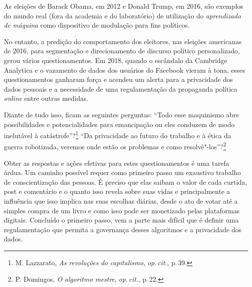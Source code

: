 As eleições de Barack Obama, em 2012 e Donald Trump, em 2016, são
exemplos do mundo real (fora da academia e do laboratório) de utilização
do \textit{aprendizado de máquina} como dispositivo de modulação para fins
políticos.

No entanto, a predição do comportamento dos eleitores, nas eleições
americanas de 2016, para segmentação e direcionamento de discurso
político personalizado, gerou vários questionamentos. Em 2018, quando o
escândalo da Cambridge Analytica e o vazamento de dados dos usuários do
Facebook vieram à tona, esses questionamentos ganharam força e acendeu
um alerta para a privacidade dos dados pessoais e a necessidade de uma
regulamentação da propaganda política \textit{online} entre outras medidas.

Diante de tudo isso, ficam as seguintes perguntas: ``Todo esse
maquinismo abre possibilidades e potencialidades para emancipação ou
eles conduzem de modo inelutável à catástrofe''?\footnote{M. Lazzarato, \textit{As revoluções do capitalismo}, \textit{op.\,cit.}, p.\,39.}
``Da privacidade ao futuro do trabalho e à ética da guerra robotizada,
veremos onde estão os problemas e como resolvê"-los''?\footnote{P. Domingos, \textit{O algoritmo mestre}, \textit{op.\,cit.}, p.\,22.}

Obter as respostas e ações efetivas para estes questionamentos é uma
tarefa árdua. Um caminho possível requer como primeiro passo um
exaustivo trabalho de conscientização das pessoas. É preciso que elas
saibam o valor de cada curtida, post e comentário e o quanto isso revela
sobre suas vidas e principalmente a influência que isso implica nas suas
escolhas diárias, desde o ato de votar até a simples compra de um livro
e como isso pode ser monetizado pelas plataformas digitais. Concluído o
primeiro passo, vem a parte mais difícil que é definir uma
regulamentação que permita a governança desses algoritmos e a
privacidade dos dados.

